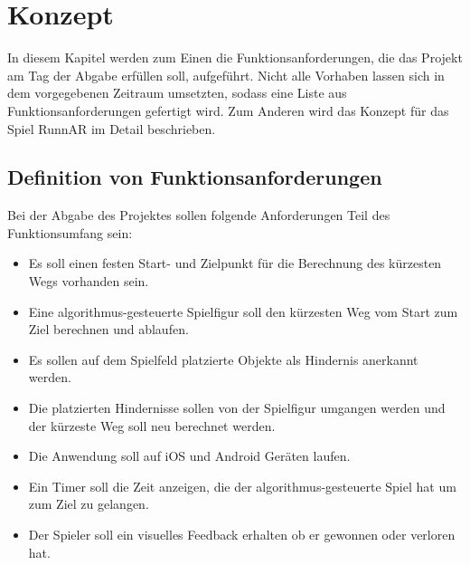 \chapter{Konzept}
\label{sec:conzept}
In diesem Kapitel werden zum Einen die Funktionsanforderungen, die das Projekt am Tag der Abgabe erfüllen soll, aufgeführt. Nicht alle Vorhaben lassen sich in dem vorgegebenen Zeitraum umsetzten, sodass eine Liste aus Funktionsanforderungen gefertigt wird. Zum Anderen wird das Konzept für das Spiel RunnAR im Detail beschrieben.

\section{Definition von Funktionsanforderungen}
Bei der Abgabe des Projektes sollen folgende Anforderungen Teil des Funktionsumfang sein:
\begin{itemize}
\item Es soll einen festen Start- und Zielpunkt für die Berechnung des kürzesten Wegs vorhanden sein.
\item Eine algorithmus-gesteuerte Spielfigur soll den kürzesten Weg vom Start zum Ziel berechnen und ablaufen.
\item Es sollen auf dem Spielfeld platzierte Objekte als Hindernis anerkannt werden.
\item Die platzierten Hindernisse sollen von der Spielfigur umgangen werden und der kürzeste Weg soll neu berechnet werden.
\item Die Anwendung soll auf iOS und Android Geräten laufen.
\item Ein Timer soll die Zeit anzeigen, die der algorithmus-gesteuerte Spiel hat um zum Ziel  zu gelangen.
\item Der Spieler soll ein visuelles Feedback erhalten ob er gewonnen oder verloren hat.
\end{itemize}

